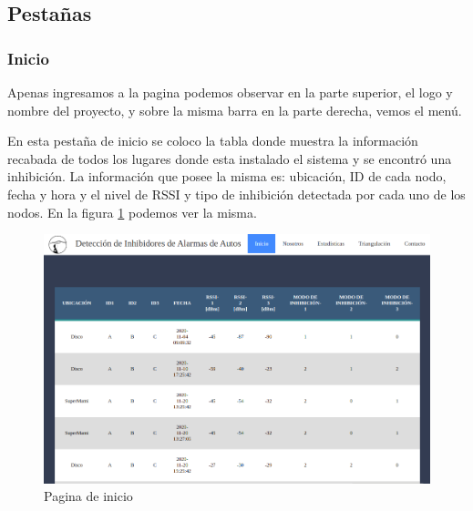 \subsection{Pestañas}
\subsubsection{Inicio}
Apenas ingresamos a la pagina podemos observar en la parte superior, el logo y nombre del proyecto, y sobre la misma barra en la parte derecha, vemos el menú.
\par En esta pestaña de inicio se coloco la tabla donde muestra la información recabada de todos los lugares donde esta instalado el sistema y se encontró una inhibición. La información que posee la misma es: ubicación, ID de cada nodo, fecha y hora y el nivel de RSSI y tipo de inhibición detectada por cada uno de los nodos. En la figura \ref{web_inicio} podemos ver la misma. 
\begin{figure}[h!]
	\centering
	\includegraphics[scale=0.3]{images/web/tabla-web.png}
    \caption{Pagina de inicio}
	\label{web_inicio}
\end{figure}
